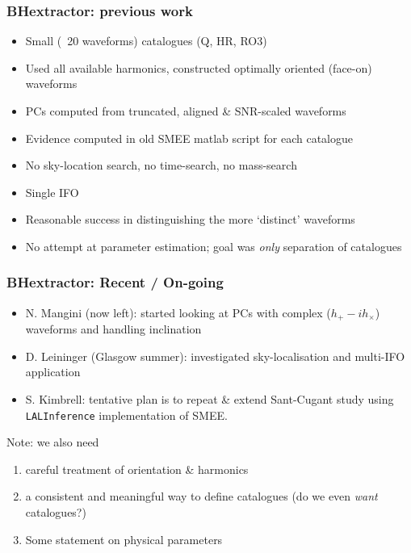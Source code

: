 \documentclass{beamer}
\begin{document}
\begin{frame}
    \frametitle{BHextractor: previous work}
    \begin{itemize}
        \item Small (~20 waveforms) catalogues (Q, HR, RO3)
        \item Used all available harmonics, constructed optimally oriented
            (face-on) waveforms
        \item PCs computed from truncated, aligned \& SNR-scaled waveforms
        \item Evidence computed in old SMEE matlab script for each catalogue
        \item No sky-location search, no time-search, no mass-search
        \item Single IFO
        \item Reasonable success in distinguishing the more `distinct' waveforms
        \item No attempt at parameter estimation; goal was \emph{only}
            separation of catalogues
    \end{itemize}
\end{frame}

\begin{frame}
    \frametitle{BHextractor: Recent / On-going}
    \begin{itemize}
        \item N. Mangini (now left): started looking at PCs with complex ($h_+ -
            i h_{\times}$) waveforms and handling inclination
        \item D. Leininger (Glasgow summer): investigated sky-localisation and
            multi-IFO application
        \item S. Kimbrell: tentative plan is to repeat \& extend Sant-Cugant
            study using {\tt LALInference} implementation of SMEE.
    \end{itemize}

    Note: we also need
    \begin{enumerate}
        \item careful treatment of orientation \& harmonics
        \item a consistent and meaningful way to define catalogues (do we even
            \emph{want} catalogues?)
        \item Some statement on physical parameters
    \end{enumerate}

\end{frame}
\end{document}
